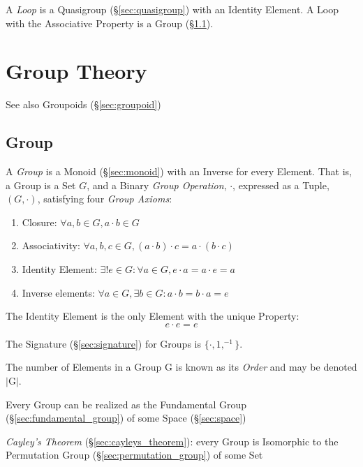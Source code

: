 A \emph{Loop} is a Quasigroup (\S\ref{sec:quasigroup}) with an
Identity Element. A Loop with the Associative Property is a Group
(\S\ref{sec:group}).



\section{Group Theory}\label{sec:group_theory}

\HandRight\; See also Groupoids (\S\ref{sec:groupoid})



\subsection{Group}\label{sec:group}

A \emph{Group} is a Monoid (\S\ref{sec:monoid}) with an Inverse for
every Element. That is, a Group is a Set $G$, and a Binary \emph{Group
  Operation}, $\cdot$, expressed as a Tuple, $(G,\cdot)$, satisfying
four \emph{Group Axioms}:
\begin{enumerate}
    \item Closure: $\forall a,b \in G, a \cdot b \in G$
    \item Associativity: $\forall a,b,c \in G, (a \cdot b) \cdot c = a
      \cdot (b \cdot c)$
    \item Identity Element: $\exists! e \in G : \forall a \in G,
      e \cdot a = a \cdot e = a$
    \item Inverse elements: $\forall a \in G, \exists b \in G :
      a \cdot b = b \cdot a = e$
\end{enumerate}
The Identity Element is the only Element with the unique Property:
\[
    e \cdot e = e
\]

The Signature (\S\ref{sec:signature}) for Groups is $\{\cdot, 1,
^{-1}\}$.

The number of Elements in a Group $\mathrm{G}$ is known as its
\emph{Order} and may be denoted $|\mathrm{G}|$.

Every Group can be realized as the Fundamental Group
(\S\ref{sec:fundamental_group}) of some Space (\S\ref{sec:space})

\emph{Cayley's Theorem} (\S\ref{sec:cayleys_theorem}): every Group is
Isomorphic to the Permutation Group (\S\ref{sec:permutation_group}) of
some Set

